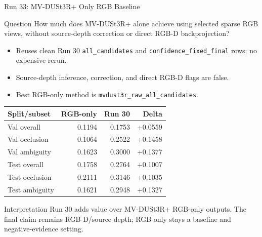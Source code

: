 \begin{frame}{Run 33: MV-DUSt3R+ Only RGB Baseline}
  \scriptsize
  \begin{block}{Question}
    How much does MV-DUSt3R+ alone achieve using selected sparse RGB views,
    without source-depth correction or direct RGB-D backprojection?
  \end{block}

  \begin{itemize}
    \item Reuses clean Run 30 \texttt{all\_candidates} and
    \texttt{confidence\_fixed\_final} rows; no expensive rerun.
    \item Source-depth inference, correction, and direct RGB-D flags are false.
    \item Best RGB-only method is \texttt{mvdust3r\_raw\_all\_candidates}.
  \end{itemize}

  \centering
  \begin{tabular}{lrrr}
    \toprule
    \textbf{Split/subset} & \textbf{RGB-only} & \textbf{Run 30} &
    \textbf{Delta} \\
    \midrule
    Val overall & 0.1194 & 0.1753 & +0.0559 \\
    Val occlusion & 0.1064 & 0.2522 & +0.1458 \\
    Val ambiguity & 0.1623 & 0.3000 & +0.1377 \\
    Test overall & 0.1758 & 0.2764 & +0.1007 \\
    Test occlusion & 0.2111 & 0.3146 & +0.1035 \\
    Test ambiguity & 0.1621 & 0.2948 & +0.1327 \\
    \bottomrule
  \end{tabular}

  \vspace{0.08cm}
  \begin{alertblock}{Interpretation}
    Run 30 adds value over MV-DUSt3R+ RGB-only outputs. The final claim remains
    RGB-D/source-depth; RGB-only stays a baseline and negative-evidence setting.
  \end{alertblock}
\end{frame}

